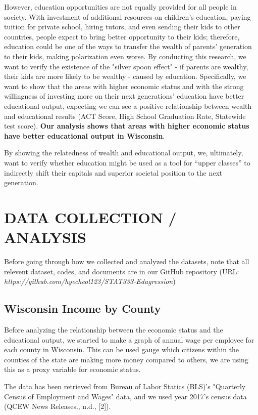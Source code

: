 \documentclass[letterpaper, 10 pt, conference]{ieeeconf}  %
\begin{document}
However, education opportunities are not equally provided for all people in society.
With investment of additional resources on children’s education, paying tuition for private school, hiring tutors, and even sending their kids to other countries, people expect to bring better opportunity to their kids; therefore, education could be one of the ways to transfer the wealth of parents’ generation to their kids, making polarization even worse.
By conducting this research, we want to verify the existence of the "silver spoon effect" - if parents are wealthy, their kids are more likely to be wealthy - caused by education.
Specifically, we want to show that the areas with higher economic status and with the strong willingness of investing more on their next generations’ education have better educational output, expecting we can see a positive relationship between wealth and educational results (ACT Score, High School Graduation Rate, Statewide test score).
\textbf{Our analysis shows that areas with higher economic status have better educational output in Wisconsin}.

By showing the relatedness of wealth and educational output, we, ultimately, want to verify whether education might be used as a tool for “upper classes” to indirectly shift their capitals and superior societal position to the next generation.

\section{DATA COLLECTION / ANALYSIS}

Before going through how we collected and analyzed the datasets, note that all relevent dataset, codes, and documents are in our GitHub repository (URL: \textit{https://github.com/hyecheol123/STAT333-Edugression})

\subsection{Wisconsin Income by County}

Before analyzing the relationship between the economic status and the educational output, we started to make a graph of annual wage per employee for each county in Wisconsin.
This can be used gauge which citizens within the counties of the state are making more money compared to others, we are using this as a proxy variable for economic status.

The data has been retrieved from Bureau of Labor Statics (BLS)'s "Quarterly Census of Employment and Wages" data, and we used year 2017's census data (QCEW News Releases., n.d., [2]).
\end{document}
